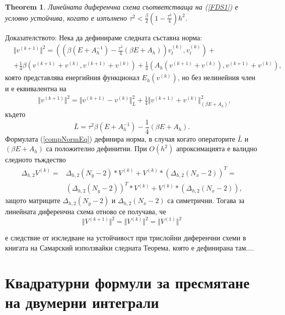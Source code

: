 \documentclass{article}
\newcommand{\be}{\begin{equation}}
\newcommand{\ee}{\end{equation}}
\newcommand{\rf}[1]{(\ref{#1})}
\newtheorem{thm}{Theorem}
\begin{document}
\begin{thm}
Линейната диференчна схема съответстваща на \rf{FDS1} е условно устойчива, когато е изпълнено
$\tau^2 < \frac{\beta}{2}(1-\frac{\tau^2}{4}) h^2$.

\end{thm}
Доказателството:
Нека да дефинираме следната съставна норма:
 \begin{align}\label{compNorm}
&\Vert v^{(k+1)} \Vert^2 = \left( \left( \beta (E+A_h^{-1})- \frac{\tau^2}{4}(\beta E+A_h ) \right)v_{t}^{(k)} ,v_{t}^{(k)} \right)+ \nonumber\\
&+\frac{1}{4} \beta \left(  v^{(k+1)}+v^{(k)}, v^{(k+1)}+v^{(k)} \right) + \frac{1}{4}  \left(  A_h(v^{(k+1)}+v^{(k)}), v^{(k+1)}+v^{(k)} \right),
\end{align}
която представлява енергийния функционал $E_h(v^{(k)})$, но без нелинейния член и е еквивалентна на
 \begin{align}\label{compNormEq}
&\Vert v^{(k+1)} \Vert^2 = \Vert v^{(k+1)} - v^{(k)}  \Vert_{\bar{L}}^2 + \frac{1}{4}\Vert  v^{(k+1)}+v^{(k)}\Vert_{(\beta E + A_h)}^2,
\end{align}
където 
$$ \bar{L} = \tau^2 \beta (E+A_h^{-1})- \frac{1}{4}(\beta E+A_h ).$$
Формулата \rf{compNormEq} дефинира норма, в случая когато операторите $\bar{L}$ и $(\beta E + A_h)$ са положително дефинитни. При $O(h^2)$ апроксимацията е валидно следното тъждество
\begin{align}
\Delta_{h,2} V^{(k)} = &\Delta_{h,2}(N_y-2) * V^{(k)} + V^{(k)} * (\Delta_{h,2}(N_x-2))^T = \nonumber\\
&(\Delta_{h,2}(N_y-2) )^T * V^{(k)} + V^{(k)} * (\Delta_{h,2}(N_x-2)),
\end{align}
защото матриците  $\Delta_{h,2}(N_y-2)$ и $\Delta_{h,2}(N_x-2)$ са симетрични.
Тогава за линейната диференчна схема отново се получава, че
\be
\Vert V^{(k+1)} \Vert^2 = \Vert V^{(k)} \Vert^2 = \Vert V^{(1)} \Vert^2
\ee

 е следствие от изследване на устойчивост при трислойни диференчни схеми в книгата на 
Самарский \cite{samarski} използвайки следната Теорема, която е дефинирана там.... 

\section{Квадратурни формули за пресмятане на двумерни интеграли}
\end{document}
